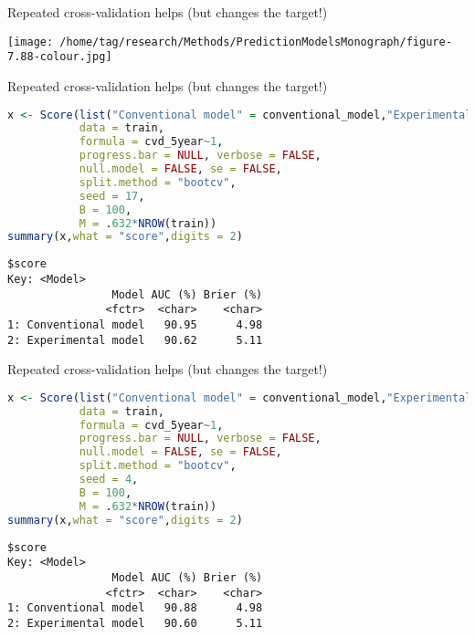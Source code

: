 \documentclass{beamer}\usepackage{listings}
\begin{document}
\begin{frame}[label={sec:org6c2ffe0},shrink=25]{Repeated cross-validation helps (but changes the target!)}
\begin{center}
\texttt{[image: /home/tag/research/Methods/PredictionModelsMonograph/figure-7.88-colour.jpg]}
\end{center}
\end{frame}
\begin{frame}[label={sec:org1d0a7c2},fragile]{Repeated cross-validation helps (but changes the target!)}
 \begin{lstlisting}[language=r,numbers=none,otherkeywords={seed,train,method,B,M}, deletekeywords={model,family,se,null,data,formula}]
x <- Score(list("Conventional model" = conventional_model,"Experimental model" = experimental_model),
           data = train,
           formula = cvd_5year~1,
           progress.bar = NULL, verbose = FALSE,
           null.model = FALSE, se = FALSE,
           split.method = "bootcv",
           seed = 17,
           B = 100,
           M = .632*NROW(train))
summary(x,what = "score",digits = 2)
\end{lstlisting}

\label{}
\begin{verbatim}
$score
Key: <Model>
                Model AUC (%) Brier (%)
               <fctr>  <char>    <char>
1: Conventional model   90.95      4.98
2: Experimental model   90.62      5.11
\end{verbatim}
\end{frame}
\begin{frame}[label={sec:org640853a},fragile]{Repeated cross-validation helps (but changes the target!)}
 \begin{lstlisting}[language=r,numbers=none,otherkeywords={seed,train,method,B,M}, deletekeywords={model,family,se,null,data,formula}]
x <- Score(list("Conventional model" = conventional_model,"Experimental model" = experimental_model),
           data = train,
           formula = cvd_5year~1,
           progress.bar = NULL, verbose = FALSE,
           null.model = FALSE, se = FALSE,
           split.method = "bootcv",
           seed = 4,
           B = 100,
           M = .632*NROW(train))
summary(x,what = "score",digits = 2)
\end{lstlisting}

\label{}
\begin{verbatim}
$score
Key: <Model>
                Model AUC (%) Brier (%)
               <fctr>  <char>    <char>
1: Conventional model   90.88      4.98
2: Experimental model   90.60      5.11
\end{verbatim}
\end{frame}
\end{document}
